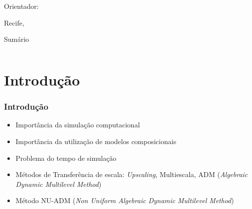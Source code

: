\documentclass[professionalfont]{beamer}
\begin{document}
\begin{frame}
    \begin{minipage}{\textwidth}
        \begin{tcolorbox}[halign=center,
    valign=center,colupper=black,boxsep=1pt,width=\textwidth,colback={white},colbacktitle=yellow]    
            \Large \titulo
        \end{tcolorbox}
    \end{minipage}
    
    \vspace{0.3cm}
    
    \begin{minipage}{\textwidth}
        \autor
        
        Orientador: \orientador
    \end{minipage}
    
    \vfill
        
    Recife, \dia
    
    
    
    
\end{frame}

\begin{frame}{Sumário}
\begin{columns}[t]
        \begin{column}{.4\textwidth}
            \tableofcontents[sections={1-3}]
        \end{column}
        \begin{column}{.4\textwidth}
            \tableofcontents[sections={4-6}]
        \end{column}
    \end{columns}
\end{frame}

\section{Introdução}



\begin{frame}
\frametitle{Introdução}
\begin{itemize}
    \item Importância da simulação computacional
    \item Importância da utilização de modelos composicionais
    \item Problema do tempo de simulação
    \item Métodos de Transferência de escala: \textit{Upscaling}, Multiescala, ADM (\textit{Algebraic Dynamic Multilevel Method})
    \item Método NU-ADM (\textit{Non Uniform Algebraic Dynamic Multilevel Method})
\end{itemize}
\end{frame}
\end{document}
